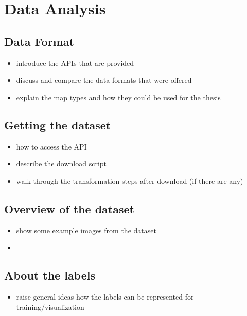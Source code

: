 \section{Data Analysis}

\subsection{Data Format}
\begin{itemize}
    \item introduce the APIs that are provided
    \item discuss and compare the data formats that were offered
    \item explain the map types and how they could be used for the thesis
\end{itemize}

\subsection{Getting the dataset}
\begin{itemize}
    \item how to access the API
    \item describe the download script
    \item walk through the transformation steps after download (if there are any)
\end{itemize}

\subsection{Overview of the dataset}
\begin{itemize}
    \item show some example images from the dataset
    \item
\end{itemize}

\subsection{About the labels}
\begin{itemize}
    \item raise general ideas how the labels can be represented for training/visualization
\end{itemize}

\newpage
